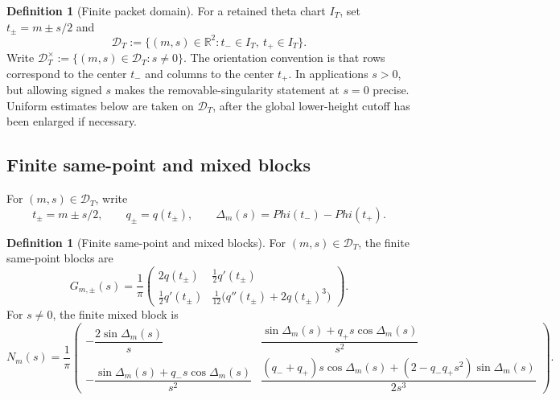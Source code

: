 \documentclass[11pt,a4paper]{amsart}
\def\Phi{Phi}%
\numberwithin{equation}{section}
\theoremstyle{plain}
\theoremstyle{definition}
\newtheorem{definition}[theorem]{Definition}
\newcommand{\Ph}{\Phi}
\newcommand{\Del}{\Delta}
\begin{document}
\begin{definition}[Finite packet domain]
\label{def:finite-packet-domain}
For a retained theta chart \(I_T\), set \(t_\pm = m\pm s/2\) and
\[
        \mathcal D_T
        :=\bigl\{(m,s)\in\mathbb R^2 : t_-\in I_T,\ t_+\in I_T\bigr\}.
\]
Write \(\mathcal D_T^\times := \{(m,s)\in\mathcal D_T : s\ne 0\}\).
The orientation convention is that rows correspond to the center
\(t_-\) and columns to the center \(t_+\).  In applications \(s>0\),
but allowing signed \(s\) makes the removable-singularity statement at
\(s=0\) precise.  Uniform estimates below are taken on
\(\mathcal D_T\), after the global lower-height cutoff has been
enlarged if necessary.
\end{definition}

\subsection{Finite same-point and mixed blocks}
\label{subsec:finite-same-point-and-mixed-blocks}

For \((m,s)\in\mathcal D_T\), write
\[
        t_\pm = m\pm s/2,
        \qquad q_\pm = q(t_\pm),
        \qquad \Del_m(s) = \Ph(t_-)-\Ph(t_+).
\]

\begin{definition}[Finite same-point and mixed blocks]
\label{def:finite-same-point-and-mixed-blocks}
For \((m,s)\in\mathcal D_T\), the finite same-point blocks are
\begin{equation}
\label{eq:Gpm}
G_{m,\pm}(s)
=\frac1\pi
\begin{pmatrix}
2q(t_\pm) & \tfrac12 q'(t_\pm)\\[0.8ex]
\tfrac12 q'(t_\pm) & \tfrac1{12}\bigl(q''(t_\pm)+2q(t_\pm)^3\bigr)
\end{pmatrix}.
\end{equation}
For \(s\ne 0\), the finite mixed block is
\begin{equation}
\label{eq:Nm}
N_m(s)
=\frac1\pi
\begin{pmatrix}
-\dfrac{2\sin\Del_m(s)}{s}
&
\dfrac{\sin\Del_m(s)+q_+ s\cos\Del_m(s)}{s^2}
\\[2.4ex]
-\dfrac{\sin\Del_m(s)+q_- s\cos\Del_m(s)}{s^2}
&
\dfrac{(q_-+q_+)s\cos\Del_m(s)+(2-q_- q_+ s^2)\sin\Del_m(s)}{2s^3}
\end{pmatrix}.
\end{equation}
\end{definition}
\end{document}
